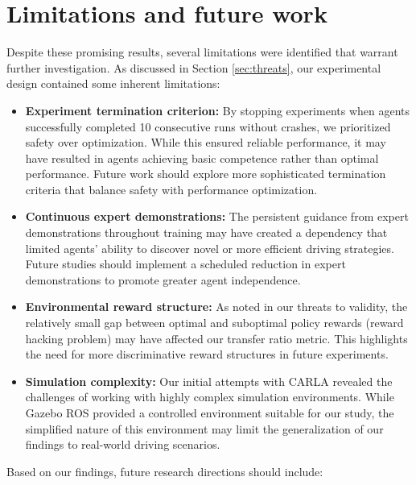 
\chapter{Limitations and future work}
Despite these promising results, several limitations were identified that warrant further investigation. As discussed in Section \ref{sec:threats}, our experimental design contained some inherent limitations:

\begin{itemize}
    \item \textbf{Experiment termination criterion:} By stopping experiments when agents successfully completed 10 consecutive runs without crashes, we prioritized safety over optimization. While this ensured reliable performance, it may have resulted in agents achieving basic competence rather than optimal performance. Future work should explore more sophisticated termination criteria that balance safety with performance optimization.

    \item \textbf{Continuous expert demonstrations:} The persistent guidance from expert demonstrations throughout training may have created a dependency that limited agents' ability to discover novel or more efficient driving strategies. Future studies should implement a scheduled reduction in expert demonstrations to promote greater agent independence.
    
    \item \textbf{Environmental reward structure:} As noted in our threats to validity, the relatively small gap between optimal and suboptimal policy rewards (reward hacking problem) may have affected our transfer ratio metric. This highlights the need for more discriminative reward structures in future experiments.
    
    \item \textbf{Simulation complexity:} Our initial attempts with CARLA revealed the challenges of working with highly complex simulation environments. While Gazebo ROS provided a controlled environment suitable for our study, the simplified nature of this environment may limit the generalization of our findings to real-world driving scenarios.
    
\end{itemize}

Based on our findings, future research directions should include:

